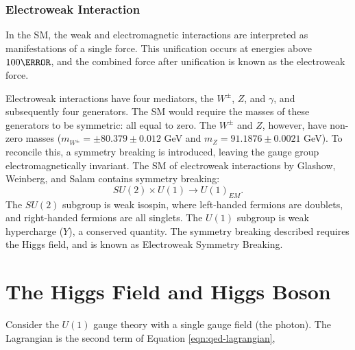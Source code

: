         \subsubsection{Electroweak Interaction} \label{sssec:ew-theory}

        In the \gls{SM}, the weak and electromagnetic interactions are interpreted as manifestations of a single force. This unification occurs at energies above $\unit{100}{\GeV}$, and the combined force after unification is known as the electroweak force.

        Electroweak interactions have four mediators, the $W^{\pm}$, $Z$, and $\gamma$, and subsequently four generators. The \gls{SM} would require the masses of these generators to be symmetric: all equal to zero. The $W^{\pm}$ and $Z$, however, have non-zero masses ($m_{W^{\pm}} = \pm80.379\pm0.012$ GeV and  $m_{Z}=91.1876\pm0.0021$ GeV). To reconcile this, a symmetry breaking is introduced, leaving the gauge group electromagnetically invariant. The \gls{SM} of electroweak interactions by Glashow, Weinberg, and Salam \cite{Glashow:1959,Weinberg:1967,Salam1959} contains symmetry breaking:
        \begin{equation}
            SU(2) \times U(1) \rightarrow U(1)_{EM}.
        \end{equation}
        The $SU(2)$ subgroup is weak isospin, where left-handed fermions are doublets, and right-handed fermions are all singlets. The $U(1)$ subgroup is weak hypercharge ($Y$), a conserved quantity. The symmetry breaking described requires the Higgs field, and is known as Electroweak Symmetry Breaking.

\section{The Higgs Field and Higgs Boson}

Consider the $U(1)$ gauge theory with a single gauge field (the photon). The Lagrangian is the second term of Equation \ref{eqn:qed-lagrangian},

